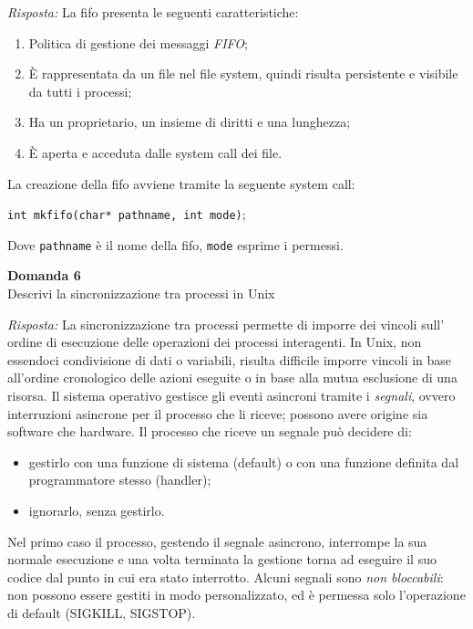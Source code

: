 \documentclass{article}
\newenvironment{problem}[2][Domanda]
    { \begin{mdframed}[backgroundcolor=gray!20] \textbf{#1 #2} \\}
    {  \end{mdframed}}
\newenvironment{solution}
    {\textit{Risposta:}}
    {}
\begin{document}
\begin{solution}
\newpage
La fifo presenta le seguenti caratteristiche:
\begin{enumerate}
    \item Politica di gestione dei messaggi \textit{FIFO};
    \item È rappresentata da un file nel file system, quindi risulta persistente e visibile da tutti i processi;
    \item Ha un proprietario, un insieme di diritti e una lunghezza;
    \item È aperta e acceduta dalle system call dei file.
\end{enumerate}
La creazione della fifo avviene tramite la seguente system call:
\begin{center}
\texttt{int mkfifo(char* pathname, int mode)};
\end{center}
Dove \texttt{pathname} è il nome della fifo, \texttt{mode} esprime i permessi.
\end{solution}
\begin{problem}{6}
Descrivi la sincronizzazione tra processi in Unix
\end{problem}
\begin{solution}
La sincronizzazione tra processi permette di imporre dei vincoli sull' ordine di esecuzione delle operazioni dei processi interagenti. In Unix, non essendoci condivisione di dati o variabili, risulta difficile imporre vincoli in base all'ordine cronologico delle azioni eseguite o in base alla mutua esclusione di una risorsa.
\newline
\newline
Il sistema operativo gestisce gli eventi asincroni tramite i \textit{segnali}, ovvero interruzioni asincrone per il processo che li riceve; possono avere origine sia software che hardware.
\newline
\newline
Il processo che riceve un segnale può decidere di:
\begin{itemize}
    \item gestirlo con una funzione di sistema (default) o con una funzione definita dal programmatore stesso (handler);
    \item ignorarlo, senza gestirlo.
\end{itemize}
Nel primo caso il processo, gestendo il segnale asincrono, interrompe la sua normale esecuzione e una volta terminata la gestione torna ad eseguire il suo codice dal punto in cui era stato interrotto.
\newline
Alcuni segnali sono \textit{non bloccabili}: non possono essere gestiti in modo personalizzato, ed è permessa solo l’operazione di default (SIGKILL, SIGSTOP).
\end{solution}
\end{document}

